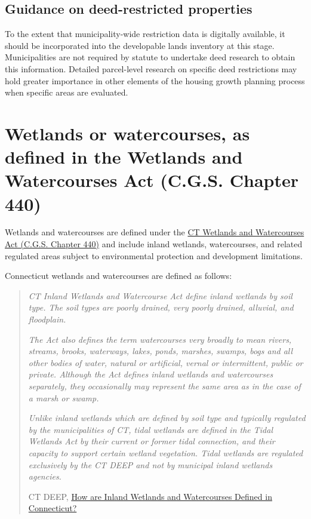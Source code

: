 \documentclass[
  letterpaper,
  DIV=11,
  numbers=noendperiod]{scrreprt}
\begin{document}
\subsection{Guidance on deed-restricted
properties}\label{guidance-on-deed-restricted-properties}

To the extent that municipality-wide restriction data is digitally
available, it should be incorporated into the developable lands
inventory at this stage. Municipalities are not required by statute to
undertake deed research to obtain this information. Detailed
parcel-level research on specific deed restrictions may hold greater
importance in other elements of the housing growth planning process when
specific areas are evaluated.

\section{Wetlands or watercourses, as defined in the Wetlands and
Watercourses Act (C.G.S. Chapter
440)}\label{wetlands-or-watercourses-as-defined-in-the-wetlands-and-watercourses-act-c.g.s.-chapter-440}

Wetlands and watercourses are defined under the
\href{https://www.cga.ct.gov/2019/pub/chap_440.htm}{CT Wetlands and
Watercourses Act (C.G.S. Chapter 440)} and include inland wetlands,
watercourses, and related regulated areas subject to environmental
protection and development limitations.

Connecticut wetlands and watercourses are defined as follows:

\begin{quote}
\emph{CT Inland Wetlands and Watercourse Act define inland wetlands by
soil type. The soil types are poorly drained, very poorly drained,
alluvial, and floodplain.}

\emph{The Act also defines the term watercourses very broadly to mean
rivers, streams, brooks, waterways, lakes, ponds, marshes, swamps, bogs
and all other bodies of water, natural or artificial, vernal or
intermittent, public or private. Although the Act defines inland
wetlands and watercourses separately, they occasionally may represent
the same area as in the case of a marsh or swamp.}

\emph{Unlike inland wetlands which are defined by soil type and
typically regulated by the municipalities of CT, tidal wetlands are
defined in the Tidal Wetlands Act by their current or former tidal
connection, and their capacity to support certain wetland vegetation.
Tidal wetlands are regulated exclusively by the CT DEEP and not by
municipal inland wetlands agencies.}

CT DEEP,
\href{https://portal.ct.gov/DEEP/Water/Inland-Wetlands/How-Are-Inland--Wetlands-and-Watercourses--Defined}{How
are Inland Wetlands and Watercourses Defined in Connecticut?}
\end{quote}
\end{document}
